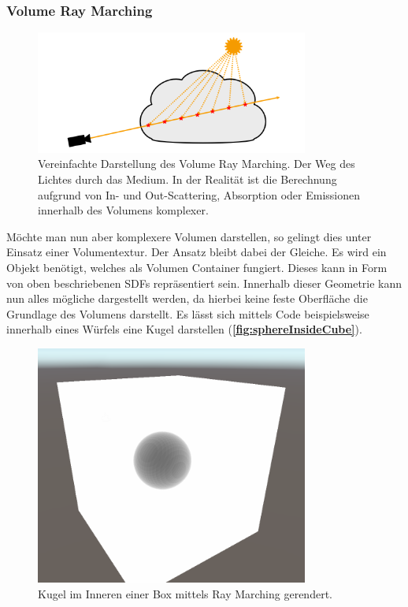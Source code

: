 



\subsubsection{Volume Ray Marching}

\begin{figure}[h]
	\centering
	\includegraphics[width=0.80\textwidth]{Grafiken/Basics/Volume/Volume_RayMarching.png}
	\begin{footnotesize}
		\caption{Vereinfachte Darstellung des Volume Ray Marching. Der Weg des Lichtes durch
			das Medium. In der Realität ist die Berechnung aufgrund von In- und Out-Scattering, Absorption oder Emissionen innerhalb des
			Volumens komplexer.}
		\label{fig:volumeRayMarching}
	\end{footnotesize}
\end{figure}


Möchte man nun aber komplexere Volumen darstellen, so gelingt dies unter Einsatz einer Volumentextur. Der Ansatz bleibt dabei der Gleiche.
Es wird ein Objekt benötigt, welches als Volumen Container fungiert. Dieses kann in Form von oben beschriebenen SDFs repräsentiert sein.
Innerhalb dieser Geometrie kann nun alles mögliche dargestellt werden, da hierbei keine feste Oberfläche die Grundlage des
Volumens darstellt. Es lässt sich mittels Code beispielsweise innerhalb eines Würfels eine Kugel darstellen (\textbf{\autoref{fig:sphereInsideCube}}).

\begin{figure}[h]
	\centering
	\includegraphics[width=0.80\textwidth]{Grafiken/Implementation/Raymarch/sphereInsideCube.png}
	\begin{footnotesize}
		\caption{Kugel im Inneren einer Box mittels Ray Marching gerendert.}
		\label{fig:sphereInsideCube}
	\end{footnotesize}
\end{figure}


